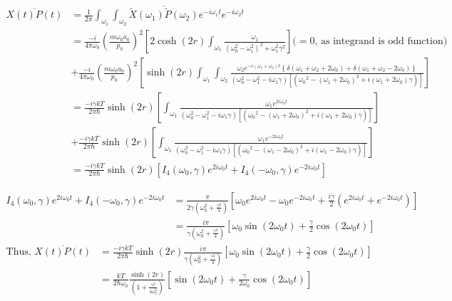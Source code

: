 \documentclass[12pt, twoside]{article}
\begin{document}
$\begin{aligned} \overline{X( t ) P(t)} &= \frac { 1 } { 2 \pi } \int _ { \omega _ { 1 }}\int_{\omega_2} \overline{\widetilde { X } ( \omega_1 )\widetilde { P } ( \omega_2 )}  e ^ { - i \omega _ { 1 } t } e ^ { - i \omega _ { 2 } t } \\ &= \frac{-i}{4\pi \omega_0}\left(\frac { m \omega _ { 0 } a_0 } { p _ { 0 } }\right)^2 \left[ 2 \cosh(2r) \int_{\omega_1} \frac{\omega_1}{(\omega_0^2 - \omega_1 ^2)^2 + \omega_1 ^2 \gamma^2}\right] \text{($=0$, as integrand is odd function)} \\&+ \frac{-i}{4\pi\omega_0}\left(\frac { m \omega _ { 0 } a_0 } { p _ { 0 } }\right)^2 \left[ \sinh(2r) \int_{\omega_1}\int_{\omega_2} \frac{\omega_2 e^{-i(\omega_1 + \omega_2) t} \left\{\delta(\omega_1 + \omega_2 + 2\omega_0) + \delta(\omega_1 + \omega_2 - 2\omega_0) \right\}}{(\omega_0^2 - \omega_1 ^2 - i\omega_1\gamma) [({\omega_0}^2 - (\omega_1 + 2\omega_0)^2 + i(\omega_1 + 2 \omega_0) \gamma)]}\right] \\&= \frac{-i\gamma k T}{2 \pi \hbar} \sinh(2r) \left[\int_{\omega_1} \frac{\omega_1 e^{2i\omega_0 t}}{(\omega_0^2 - \omega_1 ^2 - i\omega_1\gamma) [({\omega_0}^2 - (\omega_1 + 2\omega_0)^2 + i(\omega_1 + 2 \omega_0) \gamma)]} \right] \\ &+ \frac{-i\gamma k T}{2 \pi \hbar} \sinh(2r) \left[\int_{\omega_1} \frac{\omega_1 e^{-2i\omega_0 t}}{(\omega_0^2 - \omega_1 ^2 - i\omega_1\gamma) [({\omega_0}^2 - (\omega_1 - 2\omega_0)^2 + i(\omega_1 - 2 \omega_0) \gamma)]}   \right] \\& = \frac{-i\gamma k T}{2 \pi \hbar} \sinh(2r) \left[I_4(\omega_0,\gamma) e^{2i\omega_0 t} + I_4(-\omega_0,\gamma)e^{-2i\omega_0 t}\right]
\end{aligned}$

$\begin{aligned}
I_4(\omega_0,\gamma) e^{2i\omega_0 t} + I_4(-\omega_0,\gamma)e^{-2i\omega_0 t} &= \frac{\pi}{2\gamma(\omega_0 ^2 + \frac{\gamma^2}{4})} \left[\omega_0 e^{2i\omega_0 t} - \omega_{ 0 } e^{-2 i \omega_0 t} + \frac{i\gamma}{2}(e^{2i\omega_0 t} + e^{-2i \omega_0 t})\right]
\\&= \frac{i \pi}{\gamma(\omega_0 ^2 + \frac{\gamma^2}{4})} \left[\omega_0 \sin(2\omega_0 t) + \frac{\gamma}{2}\cos(2\omega_0 t)\right]
\end{aligned}$
\begin{equation}\label{eq: x_p_average}
\begin{aligned}
\text{Thus, } \overline{X( t ) P(t)} &= \frac{-i\gamma k T}{2 \pi \hbar} \sinh(2r) \frac{i \pi}{\gamma(\omega_0 ^2 + \frac{\gamma^2}{4})} \left[\omega_0 \sin(2\omega_0 t) + \frac{\gamma}{2}\cos(2\omega_0 t)\right] \\&= \frac{k T}{2 \hbar \omega_0}  \frac{\sinh(2r)}{(1 + \frac{\gamma^2}{4\omega_0 ^2})} \left[ \sin(2\omega_0 t) + \frac{\gamma}{2\omega_0}\cos(2\omega_0 t)\right]
\end{aligned}
\end{equation}
\end{document}
